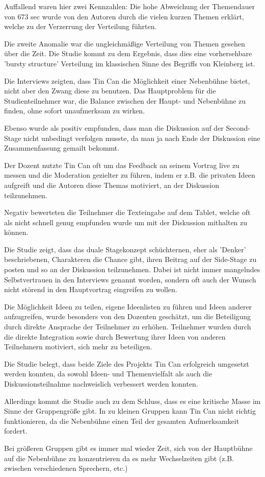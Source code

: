 Auffallend waren hier zwei Kennzahlen: Die hohe Abweichung der Themendauer von
673  sec wurde von den Autoren durch die vielen kurzen Themen erklärt, welche zu
der Verzerrung der Verteilung führten.

Die zweite Anomalie war die ungleichmäßige Verteilung von Themen gesehen über
die Zeit. Die Studie kommt zu dem Ergebnis, dass dies eine vorhersehbare 'bursty
structure' Verteilung im klassischen Sinne des Begriffs von Kleinberg
\cite{Klei2003} ist.

Die Interviews zeigten, dass Tin Can die Möglichkeit einer Nebenbühne bietet,
nicht aber den Zwang diese zu benutzen. Das Hauptproblem für die
Studienteilnehmer war, die Balance zwischen der Haupt- und Nebenbühne zu finden,
ohne sofort unaufmerksam zu wirken.

Ebenso wurde als positiv empfunden, dass man die Diskussion auf der Second-Stage
nicht unbedingt verfolgen musste, da man ja nach Ende der Diskussion eine
Zusammenfassung gemailt bekommt.

Der Dozent nutzte Tin Can oft um das Feedback an seinem Vortrag live zu messen
und die Moderation gezielter zu führen, indem er z.B. die privaten Ideen
aufgreift und die Autoren diese Themas motiviert, an der Diskussion teilzunehmen.

Negativ bewerteten die Teilnehmer die Texteingabe auf dem Tablet, welche oft
als nicht schnell genug empfunden wurde um mit der Diskussion mithalten zu können.

Die Studie zeigt, dass das duale Stagekonzept schüch\-ter\-nen, eher als 'Denker'
beschriebenen, Charakteren die Chance gibt, ihren Beitrag auf der Side-Stage zu
posten und so an der Diskussion teilzunehmen. Dabei ist nicht immer mangelndes
Selbstvertrauen in den Interviews genannt worden, sondern oft auch der Wunsch
nicht störend in den Hauptvortrag eingreifen zu wollen.

Die Möglichkeit Ideen zu teilen, eigene Ideenlisten zu füh\-ren und Ideen
anderer aufzugreifen, wurde besonders von den Dozenten geschätzt, um die Beteiligung durch
direkte Ansprache der Teilnehmer zu erhöhen. Teilnehmer wurden durch die direkte
Integration sowie durch Bewertung ihrer Ideen von anderen Teilnehmern
motiviert, sich mehr zu beteiligen.

Die Studie belegt, dass beide Ziele des Projekts Tin Can erfolgreich umgesetzt
werden konnten, da sowohl Ideen- und Themenvielfalt als auch die
Diskussionsteilnahme nachweislich verbessert werden konnten.

Allerdings kommt die Studie auch zu dem Schluss, dass es eine kritische Masse im
Sinne der Gruppengröße gibt. In zu kleinen Gruppen kann Tin Can nicht richtig
funktionieren, da die Nebenbühne einen Teil der gesamten Aufmerksamkeit fordert.

Bei größeren Gruppen gibt es immer mal wieder Zeit, sich von der Hauptbühne auf
die Nebenbühne zu konzentrieren da es mehr Wechselzeiten gibt (z.B. zwischen
verschiedenen Sprechern, etc.)





